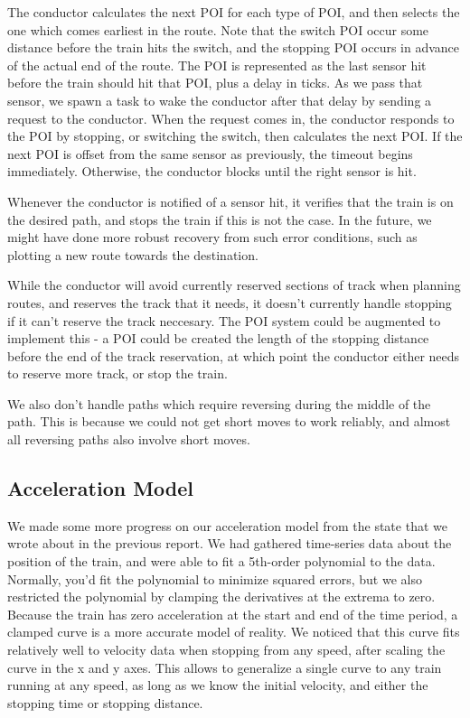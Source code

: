 \documentclass{article}
\begin{document}
The conductor calculates the next POI for each type of POI, and then selects the one which comes earliest in the route.
Note that the switch POI occur some distance before the train hits the switch, and the stopping POI occurs in advance of
the actual end of the route.
The POI is represented as the last sensor hit before the train should hit that POI, plus a delay in ticks.
As we pass that sensor, we spawn a task to wake the conductor after that delay by sending a request to the conductor.
When the request comes in, the conductor responds to the POI by stopping, or switching the switch,
then calculates the next POI.
If the next POI is offset from the same sensor as previously, the timeout begins immediately.
Otherwise, the conductor blocks until the right sensor is hit.

Whenever the conductor is notified of a sensor hit, it verifies that the train is on the desired path, and stops
the train if this is not the case.
In the future, we might have done more robust recovery from such error conditions, such as plotting a new route towards
the destination.

While the conductor will avoid currently reserved sections of track when planning routes, and reserves the track
that it needs, it doesn't currently handle stopping if it can't reserve the track neccesary.
The POI system could be augmented to implement this - a POI could be created the length of the stopping distance before the
end of the track reservation, at which point the conductor either needs to reserve more track, or stop the train.

We also don't handle paths which require reversing during the middle of the path.
This is because we could not get short moves to work reliably, and almost all reversing paths also involve short moves.

\subsection{Acceleration Model}
We made some more progress on our acceleration model from the state that we wrote about in the previous report.
We had gathered time-series data about the position of the train, and were able to fit a 5th-order polynomial to
the data.
Normally, you'd fit the polynomial to minimize squared errors, but we also restricted the polynomial by clamping
the derivatives at the extrema to zero.
Because the train has zero acceleration at the start and end of
the time period, a clamped curve is a more accurate model of reality.
We noticed that this curve fits relatively well to velocity data
when stopping from any speed, after scaling the curve in the x
and y axes.
This allows to generalize a single curve to any train running
at any speed, as long as we know the initial velocity, and
either the stopping time or stopping distance.
\end{document}
